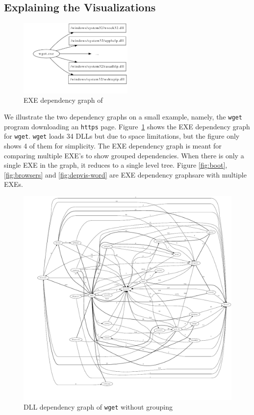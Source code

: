 \subsection{Explaining the Visualizations}

\begin{figure}[tbh]
\centering
\includegraphics[width=0.5\textwidth]{depvis/wget-exe-split.pdf}
\caption{EXE dependency graph of }
\label{fig:wget-exe-split}
\end{figure}

We illustrate the two dependency graphs on a small example, namely, the
{\tt wget} program downloading an {\tt https} page.
Figure~\ref{fig:wget-exe-split} shows the EXE dependency graph for {\tt wget}.
{\tt wget} loads 34 DLLs but due to space limitations,
but the figure only shows 4 of them for simplicity.
The EXE dependency graph is meant for comparing multiple EXE's to show
grouped dependencies.
When there is only a single EXE in the graph, it reduces to a single level
tree.
Figure \ref{fig:boot}, \ref{fig:browsers} and \ref{fig:depvis-word}
are EXE dependency graphsare with multiple EXEs.

\begin{figure}[htb]
\centering
\includegraphics[width=1.0\textwidth]{depvis/wget-nogroup.pdf}
\caption{DLL dependency graph of {\tt wget} without grouping}
\label{fig:wget-nogroup}
\end{figure}

